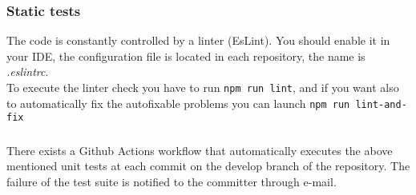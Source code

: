 \subsubsection{Static tests}
The code is constantly controlled by a linter (EsLint). You should enable it in your IDE, the configuration file is located in each repository, the name is \textit{.eslintrc}.\\
To execute the linter check you have to run \texttt{npm run lint}, and if you want also to automatically fix the autofixable problems you can launch \texttt{npm run lint-and-fix} 

\subsubsection{}
There exists a Github Actions workflow that automatically executes the above mentioned unit tests at each commit on the develop branch of the repository. The failure of the test suite is notified to the committer through e-mail.